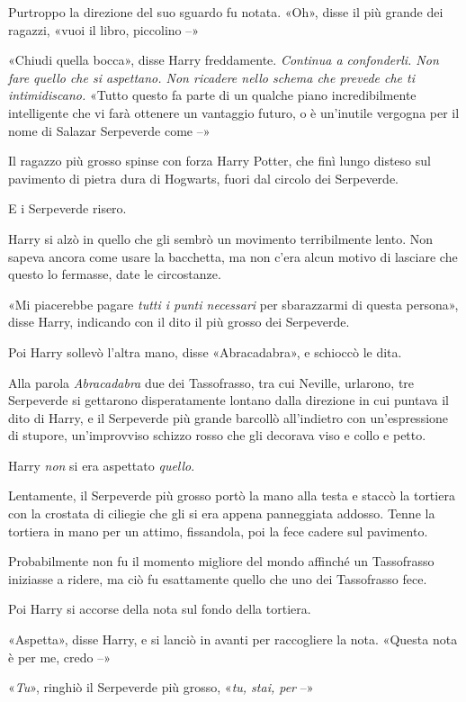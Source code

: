 Purtroppo la direzione del suo sguardo fu notata. «Oh», disse il più grande dei ragazzi, «vuoi il libro, piccolino –»

«Chiudi quella bocca», disse Harry freddamente. \textit{Continua a confonderli. Non fare quello che si aspettano. Non ricadere nello schema che prevede che ti intimidiscano.} «Tutto questo fa parte di un qualche piano incredibilmente intelligente che vi farà ottenere un vantaggio futuro, o è un’inutile vergogna per il nome di Salazar Serpeverde come –»

Il ragazzo più grosso spinse con forza Harry Potter, che finì lungo disteso sul pavimento di pietra dura di Hogwarts, fuori dal circolo dei Serpeverde.

E i Serpeverde risero.

Harry si alzò in quello che gli sembrò un movimento terribilmente lento. Non sapeva ancora come usare la bacchetta, ma non c’era alcun motivo di lasciare che questo lo fermasse, date le circostanze.

«Mi piacerebbe pagare \textit{tutti i punti necessari} per sbarazzarmi di questa persona», disse Harry, indicando con il dito il più grosso dei Serpeverde.

Poi Harry sollevò l’altra mano, disse «Abracadabra», e schioccò le dita.

Alla parola \textit{Abracadabra} due dei Tassofrasso, tra cui Neville, urlarono, tre Serpeverde si gettarono disperatamente lontano dalla direzione in cui puntava il dito di Harry, e il Serpeverde più grande barcollò all’indietro con un’espressione di stupore, un’improvviso schizzo rosso che gli decorava viso e collo e petto.

Harry \textit{non} si era aspettato \textit{quello}.

Lentamente, il Serpeverde più grosso portò la mano alla testa e staccò la tortiera con la crostata di ciliegie che gli si era appena panneggiata addosso. Tenne la tortiera in mano per un attimo, fissandola, poi la fece cadere sul pavimento.

Probabilmente non fu il momento migliore del mondo affinché un Tassofrasso iniziasse a ridere, ma ciò fu esattamente quello che uno dei Tassofrasso fece.

Poi Harry si accorse della nota sul fondo della tortiera.

«Aspetta», disse Harry, e si lanciò in avanti per raccogliere la nota. «Questa nota è per me, credo –»

«\textit{Tu}», ringhiò il Serpeverde più grosso, «\textit{tu, stai, per} –»

